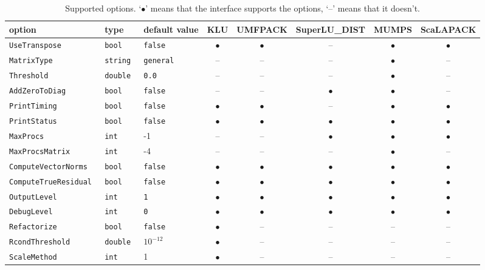 \documentclass[11pt]{SANDreport}
\begin{document}
\begin{sidewaystable}[tbhp]
  \centering
  \begin{tabular}{| p{5cm} | p{2cm} | p{2cm} | c | c | c
      | c | c |}
    \hline
    option & type & default value & KLU & UMFPACK & SuperLU\_DIST &  MUMPS & ScaLAPACK \\
    \hline
    \tt UseTranspose & \tt bool & \tt false & $\bullet$ & $\bullet$ & -- & $\bullet$
    & $\bullet$ \\
    \tt MatrixType & \tt string & \tt \tt general & -- & -- & -- & $\bullet$
    & -- \\
    \tt Threshold & \tt double & \tt 0.0 & -- & -- & -- & $\bullet$ & --
    \\
    \tt AddZeroToDiag & \tt bool & \tt false & -- & -- & $\bullet$ &
    $\bullet$ & -- \\
    \tt PrintTiming & \tt bool & \tt false & $\bullet$ & $\bullet$ & -- & $\bullet$ &
    $\bullet$ \\
    \tt PrintStatus & \tt bool & \tt false & $\bullet$ & $\bullet$ & $\bullet$  &
    $\bullet$ & $\bullet$ \\
    \tt MaxProcs & \tt int & -1 & -- & -- & $\bullet$  & $\bullet$  &
    $\bullet$  \\
    \tt MaxProcsMatrix & \tt int & -4 & -- & -- & -- & $\bullet$  & --
    \\
    \tt ComputeVectorNorms & \tt bool & \tt false & $\bullet$ & $\bullet$ & $\bullet$ & $\bullet$
    & $\bullet$ \\
    \tt ComputeTrueResidual & \tt bool & \tt false & $\bullet$ & $\bullet$ & $\bullet$ &
    $\bullet$ & $\bullet$ \\
    \tt OutputLevel & \tt int & \tt 1 & $\bullet$ & $\bullet$ & $\bullet$ &
    $\bullet$ & $\bullet$ \\
    \tt DebugLevel & \tt int & \tt 0 & $\bullet$ & $\bullet$ & $\bullet$ & $\bullet$ & $\bullet$ \\
    \tt Refactorize    & \tt bool   & \tt false  & $\bullet$ & -- & -- & -- & -- \\
    \tt RcondThreshold & \tt double & $10^{-12}$ & $\bullet$ & -- & -- & -- & -- \\
    \tt ScaleMethod    & \tt int    & 1          & $\bullet$ & -- & -- & -- & -- \\
    \hline
  \end{tabular}
  \caption{Supported options. `$\bullet$' means that the interface
    supports the options, `--' means that it doesn't.}
  \label{tab:options}
\end{sidewaystable}
\end{document}
